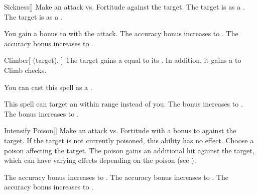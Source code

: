 \lowercase{\hypertarget{spell:Sickness}{}}\label{spell:Sickness}
\begin{freeability}[Rank 1]{\hypertarget{spell:Sickness}{Sickness}}[]
Make an attack vs. Fortitude against the target.
\hit The target is  as a .
\crit The target is  as a .

\rankline
{} You gain a  bonus to  with the attack.
 The accuracy bonus increases to .
 The accuracy bonus increases to .

\end{freeability}
\vspace{0.25em}



\lowercase{\hypertarget{spell:Climber}{}}\label{spell:Climber}
\begin{attuneability}[Rank 2]{\hypertarget{spell:Climber}{Climber}}[ (target), ]
The target gains a  equal to its .
In addition, it gains a   to Climb checks.

You can cast this spell as a .

\rankline
{} This spell can target an  within \rngmed range instead of you.
 The bonus increases to .
 The bonus increases to .

\end{attuneability}
\vspace{0.25em}



\lowercase{\hypertarget{spell:Intensify Poison}{}}\label{spell:Intensify Poison}
\begin{freeability}[Rank 2]{\hypertarget{spell:Intensify Poison}{Intensify Poison}}[]
Make an attack vs. Fortitude with a  bonus to  against the target.
If the target is not currently poisoned, this ability has no effect.
\hit Choose a poison affecting the target.
The poison gains an additional hit against the target, which can have varying effects depending on the poison (see ).

\rankline
{} The accuracy bonus increases to .
 The accuracy bonus increases to .
 The accuracy bonus increases to .

\end{freeability}
\vspace{0.25em}



